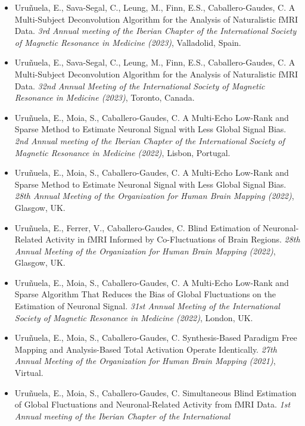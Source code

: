 \begin{itemize}
    \item {Uruñuela, E., Sava-Segal, C., Leung, M., Finn, E.S.,
    Caballero-Gaudes, C. A Multi-Subject Deconvolution Algorithm for the
    Analysis of Naturalistic fMRI Data. \textit{3rd Annual meeting of the
    Iberian Chapter of the International Society of Magnetic Resonance in
    Medicine (2023)}, Valladolid, Spain.}
    \item {Uruñuela, E., Sava-Segal, C., Leung, M., Finn, E.S.,
    Caballero-Gaudes, C. A Multi-Subject Deconvolution Algorithm for the
    Analysis of Naturalistic fMRI Data. \textit{32nd Annual Meeting of the
    International Society of Magnetic Resonance in Medicine (2023)}, Toronto,
    Canada.}
    \item {Uruñuela, E., Moia, S., Caballero-Gaudes, C. A Multi-Echo Low-Rank
    and Sparse Method to Estimate Neuronal Signal with Less Global Signal Bias.
    \textit{2nd Annual meeting of the Iberian Chapter of the International
    Society of Magnetic Resonance in Medicine (2022)}, Lisbon, Portugal.}
    \item {Uruñuela, E., Moia, S., Caballero-Gaudes, C. A Multi-Echo Low-Rank
    and Sparse Method to Estimate Neuronal Signal with Less Global Signal Bias.
    \textit{28th Annual Meeting of the Organization for Human Brain Mapping
    (2022)}, Glasgow, UK.}
    \item {Uruñuela, E., Ferrer, V., Caballero-Gaudes, C. Blind Estimation of
    Neuronal-Related Activity in fMRI Informed by Co-Fluctuations of Brain
    Regions. \textit{28th Annual Meeting of the Organization for Human Brain
    Mapping (2022)}, Glasgow, UK.}
    \item {Uruñuela, E., Moia, S., Caballero-Gaudes, C. A Multi-Echo Low-Rank
    and Sparse Algorithm That Reduces the Bias of Global Fluctuations on the
    Estimation of Neuronal Signal. \textit{31st Annual Meeting of the
    International Society of Magnetic Resonance in Medicine (2022)}, London,
    UK.}
    \item {Uruñuela, E., Moia, S., Caballero-Gaudes, C. Synthesis-Based Paradigm
    Free Mapping and Analysis-Based Total Activation Operate Identically.
    \textit{27th Annual Meeting of the Organization for Human Brain Mapping
    (2021)}, Virtual.}
    \item {Uruñuela, E., Moia, S., Caballero-Gaudes, C. Simultaneous Blind
    Estimation of Global Fluctuations and Neuronal-Related Activity from fMRI
    Data. \textit{1st Annual meeting of the Iberian Chapter of the International
}}
\end{itemize}
